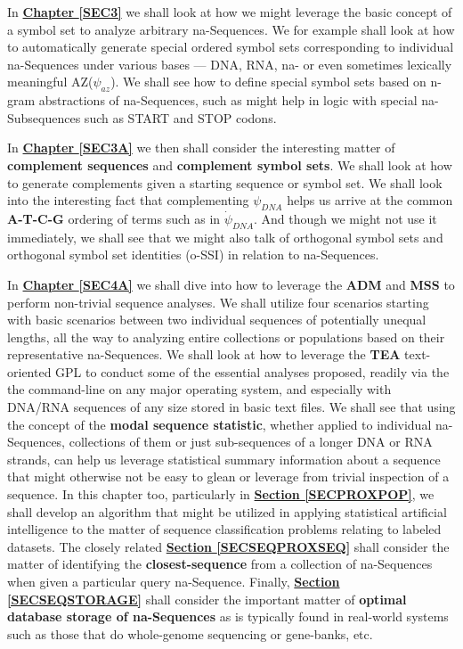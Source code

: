 \documentclass[a4paper, 18pt]{book} %
\begin{document}
In \textbf{\hyperref[SEC3]{Chapter \ref{SEC3}}} we shall look at how we might leverage the basic concept of a symbol set to analyze arbitrary na-Sequences. We for example shall look at how to automatically generate special ordered symbol sets corresponding to individual na-Sequences under various bases --- DNA, RNA, na- or even sometimes lexically meaningful AZ($\psi_{az}$). We shall see how to define special symbol sets based on n-gram abstractions of na-Sequences, such as might help in logic with special na-Subsequences such as START and STOP codons.


In \textbf{\hyperref[SEC3A]{Chapter \ref{SEC3A}}} we then shall consider the interesting matter of \textbf{complement sequences} and \textbf{complement symbol sets}. We shall look at how to generate complements given a starting sequence or symbol set. We shall look into the interesting fact that complementing $\psi_{DNA}$ helps us arrive at the common \textbf{A-T-C-G} ordering of terms such as in $\dot{\psi}_{DNA}$. And though we might not use it immediately, we shall see that we might also talk of orthogonal symbol sets and orthogonal symbol set identities (o-SSI\cite{ossipaper}) in relation to na-Sequences.

In \textbf{\hyperref[SEC4A]{Chapter \ref{SEC4A}}} we shall dive into how to leverage the \textbf{ADM} and \textbf{MSS} to perform non-trivial sequence analyses. We shall utilize four scenarios starting with basic scenarios between two individual sequences of potentially unequal lengths, all the way to analyzing entire collections or populations based on their representative na-Sequences. We shall look at how to leverage the \textbf{TEA}\cite{Lutalo2024_taz}\cite{cli_tttt} text-oriented GPL to conduct some of the essential analyses proposed, readily via the the command-line on any major operating system, and especially with DNA/RNA sequences of any size stored in basic text files. We shall see that using the concept of the \textbf{modal sequence statistic}, whether applied to individual na-Sequences, collections of them or just sub-sequences of a longer DNA or RNA strands, can help us leverage statistical summary information about a sequence that might otherwise not be easy to glean or leverage from trivial inspection of a sequence. In this chapter too, particularly in \textbf{\hyperref[SECPROXPOP]{Section \ref{SECPROXPOP}}}, we shall develop an algorithm that might be utilized in applying statistical artificial intelligence to the matter of sequence classification problems relating to labeled datasets. The closely related \textbf{\hyperref[SECSEQPROXSEQ]{Section \ref{SECSEQPROXSEQ}}} shall consider the matter of identifying the \textbf{closest-sequence} from a collection of na-Sequences when given a particular query na-Sequence. Finally, \textbf{\hyperref[SECSEQSTORAGE]{Section \ref{SECSEQSTORAGE}}} shall consider the important matter of \textbf{optimal database storage of na-Sequences} as is typically found in real-world systems such as those that do whole-genome sequencing or gene-banks, etc. 
\end{document}
